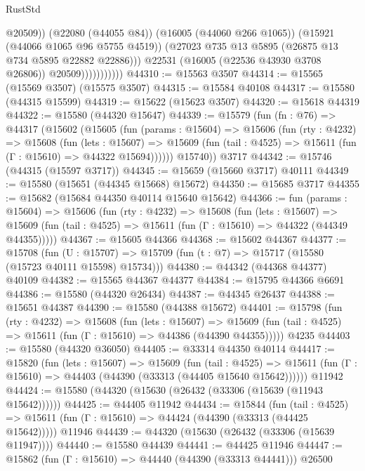 \begin{lexlean}{RustStd}
\begin{coremodule}
                                @20509))
                            (@22080 (@44055 @84))
                            (@16005 (@44060 @266 @1065))
                            (@15921 (@44066 @1065 @96 @5755 @4519))
                            (@27023 @735 @13 @5895 (@26875 @13 @734 @5895 @22882 @22886)))
                          @22531
                          (@16005 (@22536 @43930 @3708 @26806))
                          @20509)))))))))))
@44310 := @15563 @3507
@44314 := @15565 (@15569 @3507) (@15575 @3507)
@44315 := @15584 @40108
@44317 := @15580 (@44315 @15599)
@44319 := @15622 (@15623 @3507)
@44320 := @15618 @44319
@44322 := @15580 (@44320 @15647)
@44339 := @15579
    (fun (fn : @76) =>
    @44317
      (@15602
        (@15605
          (fun (params : @15604) =>
          @15606
            (fun (rty : @4232) =>
            @15608
              (fun (lets : @15607) =>
              @15609 (fun (tail : @4525) => @15611 (fun (Γ : @15610) => @44322 @15694))))))
        @15740))
    @3717
@44342 := @15746 (@44315 (@15597 @3717))
@44345 := @15659 (@15660 @3717) @40111
@44349 := @15580 (@15651 (@44345 @15668) @15672)
@44350 := @15685 @3717
@44355 := @15682 (@15684 @44350 @40114 @15640 @15642)
@44366 := fun (params : @15604) =>
  @15606
    (fun (rty : @4232) =>
    @15608
      (fun (lets : @15607) =>
      @15609 (fun (tail : @4525) => @15611 (fun (Γ : @15610) => @44322 (@44349 @44355)))))
@44367 := @15605 @44366
@44368 := @15602 @44367
@44377 := @15708
    (fun (U : @15707) => @15709 (fun (t : @7) => @15717 (@15580 (@15723 @40111 @15598) @15734)))
@44380 := @44342 (@44368 @44377) @40109
@44382 := @15565 @44367 @44377
@44384 := @15795 @44366 @6691
@44386 := @15580 (@44320 @26434)
@44387 := @44345 @26437
@44388 := @15651 @44387
@44390 := @15580 (@44388 @15672)
@44401 := @15798
    (fun (rty : @4232) =>
    @15608
      (fun (lets : @15607) =>
      @15609 (fun (tail : @4525) => @15611 (fun (Γ : @15610) => @44386 (@44390 @44355)))))
    @4235
@44403 := @15580 (@44320 @36050)
@44405 := @33314 @44350 @40114
@44417 := @15820
    (fun (lets : @15607) =>
    @15609
      (fun (tail : @4525) =>
      @15611 (fun (Γ : @15610) => @44403 (@44390 (@33313 (@44405 @15640 @15642))))))
    @11942
@44424 := @15580 (@44320 (@15630 (@26432 (@33306 (@15639 (@11943 @15642))))))
@44425 := @44405 @11942
@44434 := @15844
    (fun (tail : @4525) => @15611 (fun (Γ : @15610) => @44424 (@44390 (@33313 (@44425 @15642)))))
    @11946
@44439 := @44320 (@15630 (@26432 (@33306 (@15639 @11947))))
@44440 := @15580 @44439
@44441 := @44425 @11946
@44447 := @15862 (fun (Γ : @15610) => @44440 (@44390 (@33313 @44441))) @26500

\end{coremodule}
\end{lexlean}
